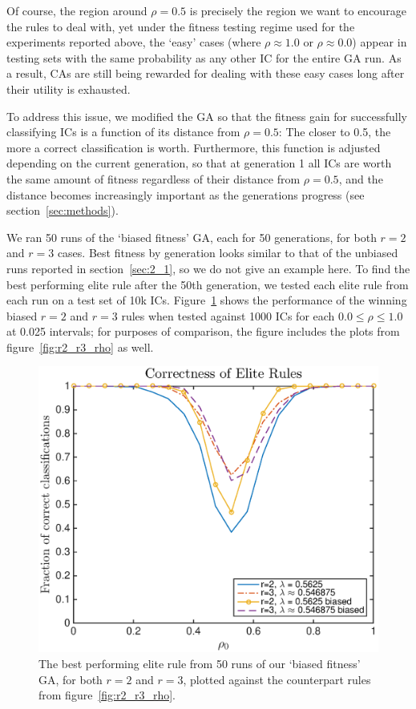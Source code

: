 Of course, the region around $\rho = 0.5$ is precisely the region we want to encourage the rules to deal with, yet under the fitness testing regime 
used for the experiments reported above, the `easy' cases (where $\rho \approx 1.0$ or $\rho \approx 0.0$) appear in testing sets  
with the same probability as any other IC for the entire GA run. As a result, CAs are still being rewarded for dealing with these easy cases long after their 
utility is exhausted.

To address this issue, we modified the GA so that the fitness gain for successfully classifying ICs is a function of its distance from $\rho = 0.5$: The 
closer to 0.5, the more a correct classification is worth. Furthermore, this function is adjusted depending on the current generation, so that at generation 1 
all ICs are worth the same amount of fitness regardless of their distance from $\rho = 0.5$, and the distance becomes increasingly important as 
the generations progress (see section~\ref{sec:methods}).

We ran 50 runs of the `biased fitness' GA, each for 50 generations, for both $r = 2$ and $r = 3$ cases. Best fitness by generation looks similar to that 
of the unbiased runs reported in section~\ref{sec:2_1}, so we do not give an example here. To find the best performing elite rule after the 
50th generation, we tested each elite rule from each run on a test set of 10k ICs. Figure~\ref{fig:r2_r3_rho_biased} shows the performance 
of the winning biased $r = 2$ and $r = 3$ rules when tested against 1000 ICs for each $0.0 \leq \rho \leq 1.0$ at 0.025 intervals; for purposes of 
comparison, the figure includes the plots from figure~\ref{fig:r2_r3_rho} as well.

\begin{figure}
\begin{center}
\includegraphics[width=\linewidth]{figures/lambda_biased_correctness_plot.eps}
\caption{The best performing elite rule from 50 runs of our `biased fitness' GA, for both $r = 2$ and $r = 3$, plotted against the counterpart rules from 
figure~\ref{fig:r2_r3_rho}.}
\label{fig:r2_r3_rho_biased}
\end{center}
\end{figure}


